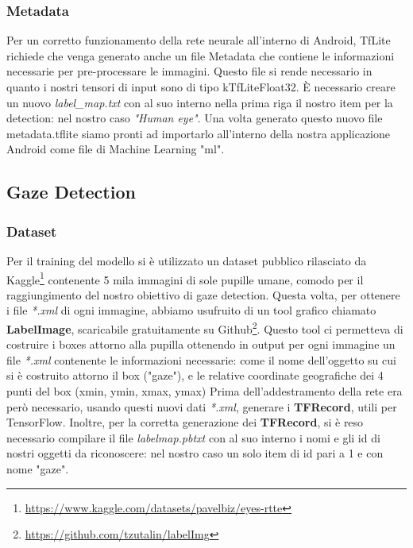 \documentclass[11pt]{article}
\begin{document}
\subsubsection{Metadata}
Per un corretto funzionamento della rete neurale all'interno di Android, TfLite richiede che venga generato anche un file Metadata che contiene le informazioni necessarie per pre-processare le immagini. Questo file si rende necessario in quanto i nostri tensori di input sono di tipo kTfLiteFloat32. È necessario creare un nuovo \textit{label\_map.txt} con al suo interno nella prima riga il nostro item per la detection: nel nostro caso \textit{"Human eye"}.
\newline
Una volta generato questo nuovo file metadata.tflite siamo pronti ad importarlo all'interno della nostra applicazione Android come file di Machine Learning "ml".

\newpage    
\subsection{Gaze Detection}

\subsubsection{Dataset}
Per il training del modello si è utilizzato un dataset pubblico rilasciato da Kaggle\footnote{\url{https://www.kaggle.com/datasets/pavelbiz/eyes-rtte}} contenente 5 mila immagini di sole pupille umane, comodo per il raggiungimento del nostro obiettivo di gaze detection.
\newline
Questa volta, per ottenere i file \textit{*.xml} di ogni immagine, abbiamo usufruito di un tool grafico chiamato \textbf{LabelImage}, scaricabile gratuitamente su Github\footnote{\url{https://github.com/tzutalin/labelImg}}. Questo tool ci permetteva di costruire i boxes attorno alla pupilla ottenendo in output per ogni immagine un file \textit{*.xml} contenente le informazioni necessarie: come il nome dell'oggetto su cui si è costruito attorno il box ("gaze"), e le relative coordinate geografiche dei 4 punti del box (xmin, ymin, xmax, ymax)
\newline \newline
Prima dell'addestramento della rete era però necessario, usando questi nuovi dati \textit{*.xml}, generare i \textbf{TFRecord}, utili per TensorFlow.
Inoltre, per la corretta generazione dei \textbf{TFRecord}, si è reso necessario compilare il file \textit{labelmap.pbtxt} con al suo interno i nomi e gli id di nostri oggetti da riconoscere: nel nostro caso un solo item di id pari a 1 e con nome "gaze".
\end{document}
